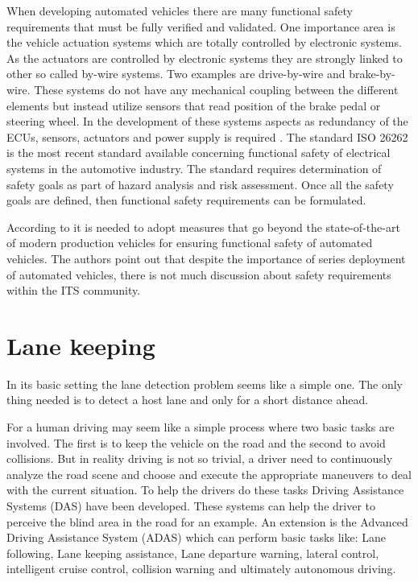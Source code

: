 When developing automated vehicles there are many functional safety requirements that must be fully verified and validated. One importance area is the vehicle actuation systems which are totally controlled by electronic systems. As the actuators are controlled by electronic systems they are strongly linked to other so called by-wire systems. Two examples are drive-by-wire and brake-by-wire. These systems do not have any mechanical coupling between the different elements but instead utilize sensors that read position of the brake pedal or steering wheel. In the development of these systems aspects as redundancy of the ECUs, sensors, actuators and power supply is required \cite{stolte2016safety}. 	The standard ISO 26262 is the most recent standard available concerning functional safety of electrical systems in the automotive industry. The standard requires determination of safety goals as part of hazard analysis and risk assessment. Once all the safety goals are defined, then functional safety requirements can be formulated.

According to \cite{stolte2016safety} it is needed to adopt measures that go beyond the state-of-the-art of modern production vehicles for ensuring functional safety of automated vehicles. The authors point out that despite the importance of series deployment of automated vehicles, there is not much discussion about safety requirements within the ITS community.  


\section{Lane keeping}
In its basic setting the lane detection problem seems like a simple one. The only thing needed is to detect a host lane and only for a short distance ahead.

For a human driving may seem like a simple process where two basic tasks are involved. The first is to keep the vehicle on the road and the second to avoid collisions. But in reality driving is not so trivial, a driver need to continuously analyze the road scene and choose and execute the appropriate maneuvers to deal with the current situation. To help the drivers do these tasks Driving Assistance Systems (DAS) have been developed. These systems can help the driver to perceive the blind area in the road for an example. An extension is the Advanced Driving Assistance System (ADAS) which can perform basic tasks like: Lane following, Lane keeping assistance, Lane departure warning, lateral control, intelligent cruise control, collision warning and ultimately autonomous driving.\\

